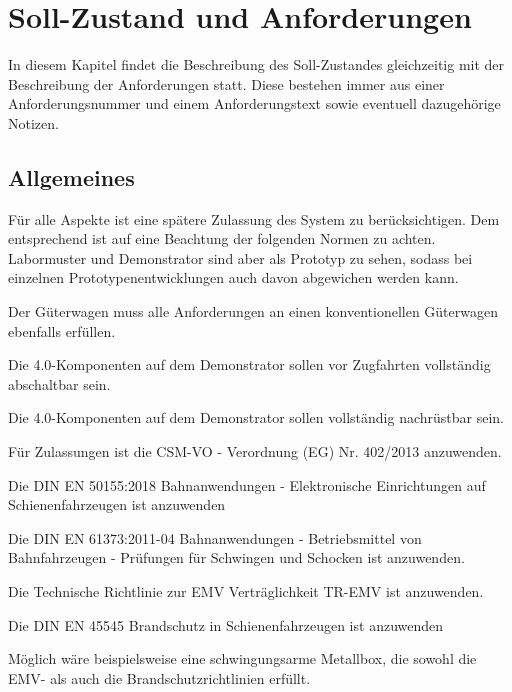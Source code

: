 \section{Soll-Zustand und Anforderungen}
In diesem Kapitel findet die Beschreibung des Soll-Zustandes gleichzeitig %
mit der Beschreibung der Anforderungen statt. Diese bestehen immer aus einer Anforderungsnummer und einem Anforderungstext sowie eventuell dazugehörige Notizen.\par

\subsection{Allgemeines}
Für alle Aspekte ist eine spätere Zulassung des System zu berücksichtigen. Dem entsprechend ist auf eine Beachtung der folgenden Normen zu achten. Labormuster und Demonstrator sind aber als Prototyp zu sehen, sodass bei einzelnen Prototypenentwicklungen auch davon abgewichen werden kann.
\begin{feat}
Der Güterwagen muss alle Anforderungen an einen konventionellen Güterwagen ebenfalls erfüllen.
\end{feat}
\begin{feat}
Die 4.0-Komponenten auf dem Demonstrator sollen vor Zugfahrten vollständig abschaltbar sein.
\end{feat}
\begin{feat}
Die 4.0-Komponenten auf dem Demonstrator sollen vollständig nachrüstbar sein.
\end{feat}
\begin{feat}
Für Zulassungen ist die CSM-VO - Verordnung (EG) Nr. 402/2013 anzuwenden.
\end{feat}
\begin{feat}
Die \acrshort{DIN} \acrshort{EN} 50155:2018 Bahnanwendungen - Elektronische Einrichtungen auf Schienenfahrzeugen ist anzuwenden
\end{feat}
\begin{feat}
Die \acrshort{DIN} \acrshort{EN} 61373:2011-04 Bahnanwendungen - Betriebsmittel von Bahnfahrzeugen - Prüfungen für Schwingen und Schocken ist anzuwenden.
\end{feat}
\begin{feat}
Die Technische Richtlinie zur EMV Verträglichkeit TR-EMV ist anzuwenden.
\end{feat}
\begin{feat}
Die \acrshort{DIN} \acrshort{EN} 45545 Brandschutz in Schienenfahrzeugen ist anzuwenden
\end{feat}
\begin{rem}[zu Anf. 6-8]
Möglich wäre beispielsweise eine schwingungsarme Metallbox, die sowohl die EMV- als auch die Brandschutzrichtlinien erfüllt.
\end{rem}

